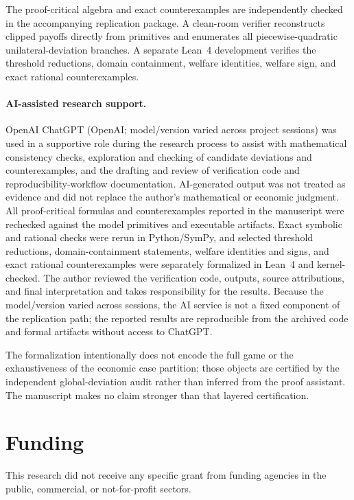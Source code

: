 \documentclass[11pt]{article}
\begin{document}
The proof-critical algebra and exact counterexamples are independently checked
in the accompanying replication package. A clean-room verifier reconstructs
clipped payoffs directly from primitives and enumerates all
piecewise-quadratic unilateral-deviation branches. A separate Lean~4
development verifies the threshold reductions, domain containment, welfare
identities, welfare sign, and exact rational counterexamples.

\paragraph{AI-assisted research support.}
OpenAI ChatGPT (OpenAI; model/version varied across project sessions) was used
in a supportive role during the research process to assist with mathematical
consistency checks, exploration and checking of candidate deviations and
counterexamples, and the drafting and review of verification code and
reproducibility-workflow documentation. AI-generated output was not treated as
evidence and did not replace the author's mathematical or economic judgment.
All proof-critical formulas and counterexamples reported in the manuscript were
rechecked against the model primitives and executable artifacts. Exact symbolic
and rational checks were rerun in Python/SymPy, and selected threshold
reductions, domain-containment statements, welfare identities and signs, and
exact rational counterexamples were separately formalized in Lean~4 and
kernel-checked. The author reviewed the verification code, outputs, source
attributions, and final interpretation and takes responsibility for the
results. Because the model/version varied across sessions, the AI service is
not a fixed component of the replication path; the reported results are
reproducible from the archived code and formal artifacts without access to
ChatGPT.

The formalization intentionally does not encode the full game or the
exhaustiveness of the economic case partition; those objects are certified by
the independent global-deviation audit rather than inferred from the proof
assistant. The manuscript makes no claim stronger than that layered
certification.

\section*{Funding}

This research did not receive any specific grant from funding agencies in the
public, commercial, or not-for-profit sectors.
\end{document}
